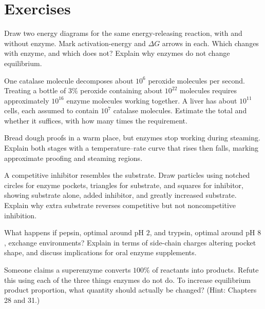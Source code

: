 \section*{Exercises}

\begin{sikaoti}
\item Draw two energy diagrams for the same energy-releasing reaction, with and without enzyme. Mark activation-energy and $\Delta G$ arrows in each. Which changes with enzyme, and which does not? Explain why enzymes do not change equilibrium.
\item One catalase molecule decomposes about $10^{6}$ peroxide molecules per second. Treating a bottle of $3\%$ peroxide containing about $10^{22}$ molecules requires approximately $10^{16}$ enzyme molecules working together. A  liver has about $10^{11}$ cells, each assumed to contain $10^{7}$ catalase molecules. Estimate the total and whether it suffices, with how many times the requirement.
\item Bread dough proofs in a warm place, but enzymes stop working during steaming. Explain both stages with a temperature--rate curve that rises then falls, marking approximate proofing and steaming regions.
\item A competitive inhibitor resembles the substrate. Draw particles using notched circles for enzyme pockets, triangles for substrate, and squares for inhibitor, showing substrate alone, added inhibitor, and greatly increased substrate. Explain why extra substrate reverses competitive but not noncompetitive inhibition.
\item What happens if pepsin, optimal around pH $2$, and trypsin, optimal around pH $8$, exchange environments? Explain in terms of side-chain charges altering pocket shape, and discuss implications for oral enzyme supplements.
\item Someone claims a superenzyme converts $100\%$ of reactants into products. Refute this using each of the three things enzymes do not do. To increase equilibrium product proportion, what quantity should actually be changed? (Hint: Chapters 28 and 31.)
\end{sikaoti}
